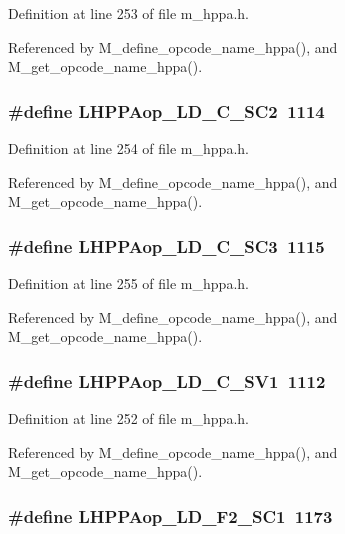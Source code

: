 Definition at line 253 of file m\_\-hppa.h.

Referenced by M\_\-define\_\-opcode\_\-name\_\-hppa(), and M\_\-get\_\-opcode\_\-name\_\-hppa().
\subsubsection{\setlength{\rightskip}{0pt plus 5cm}\#define LHPPAop\_\-LD\_\-C\_\-SC2~1114}\label{m__hppa_8h_de017d590425133fd1183feb9987a46f}




Definition at line 254 of file m\_\-hppa.h.

Referenced by M\_\-define\_\-opcode\_\-name\_\-hppa(), and M\_\-get\_\-opcode\_\-name\_\-hppa().
\subsubsection{\setlength{\rightskip}{0pt plus 5cm}\#define LHPPAop\_\-LD\_\-C\_\-SC3~1115}\label{m__hppa_8h_21c979f01c2a7882c3b81316cec14683}




Definition at line 255 of file m\_\-hppa.h.

Referenced by M\_\-define\_\-opcode\_\-name\_\-hppa(), and M\_\-get\_\-opcode\_\-name\_\-hppa().
\subsubsection{\setlength{\rightskip}{0pt plus 5cm}\#define LHPPAop\_\-LD\_\-C\_\-SV1~1112}\label{m__hppa_8h_04998d2acbb2de665ca87c2684ccadd0}




Definition at line 252 of file m\_\-hppa.h.

Referenced by M\_\-define\_\-opcode\_\-name\_\-hppa(), and M\_\-get\_\-opcode\_\-name\_\-hppa().
\subsubsection{\setlength{\rightskip}{0pt plus 5cm}\#define LHPPAop\_\-LD\_\-F2\_\-SC1~1173}\label{m__hppa_8h_38573b765c77b8cde9e07958216a3085}




